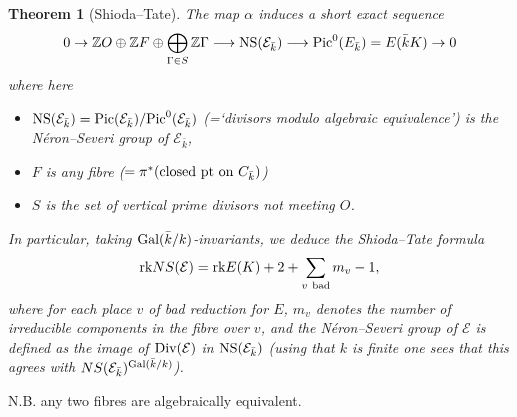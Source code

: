 \documentclass[12pt]{amsart}
\numberwithin{equation}{section}
\newtheorem{theorem}[equation]{Theorem}
\theoremstyle{remark}
\theoremstyle{definition}
\theoremstyle{definition}
\theoremstyle{definition}
\theoremstyle{definition}
\theoremstyle{definition}
\theoremstyle{definition}
\theoremstyle{definition}
\begin{document}
\begin{theorem}[Shioda--Tate]
The map $\alpha$ induces a short exact sequence
\[0\rightarrow \mathbb{Z}O\oplus \mathbb{Z}F \oplus \bigoplus_{\Gamma \in S}\mathbb{Z}\Gamma \longrightarrow \textup{NS}(\mathcal{E}_{\bar{k}})\longrightarrow \textup{Pic}^0(E_{\bar{k}})=E(\bar{k}K)\rightarrow 0
\]
where here 
\begin{itemize}
\item $\textup{NS}(\mathcal{E}_{\bar{k}})=\textup{Pic}(\mathcal{E}_{\bar{k}})/\textup{Pic}^0(\mathcal{E}_{\bar{k}})$ (=`divisors modulo algebraic equivalence') is the \textup{N\'{e}ron--Severi group} of $\mathcal{E}_{\bar{k}}$,\\
\item $F$ is any fibre ($=\pi^*(\textup{closed pt on }C_{\bar{k}})$)\\
\item $S$ is the set of vertical prime divisors not meeting $O$.
\end{itemize}
In particular, taking $\textup{Gal}(\bar{k}/k)$-invariants, we deduce the \textit{Shioda--Tate formula}
\[\textup{rk}NS(\mathcal{E})=\textup{rk}E(K)+2+\sum_{v~\textup{bad}}m_v-1,\]
where for each place $v$ of bad reduction for $E$, $m_v$ denotes the number of irreducible components in the fibre over $v$, and the \textit{N\'{e}ron--Severi} group of $\mathcal{E}$ is defined as the image of $\textup{Div}(\mathcal{E})$ in $\textup{NS}(\mathcal{E}_{\bar{k}})$ (using that $k$ is finite one sees that this agrees with $NS(\mathcal{E}_{\bar{k}})^{\textup{Gal}(\bar{k}/k)}$).  
\end{theorem}

N.B. any two fibres are algebraically equivalent. 
\end{document}
